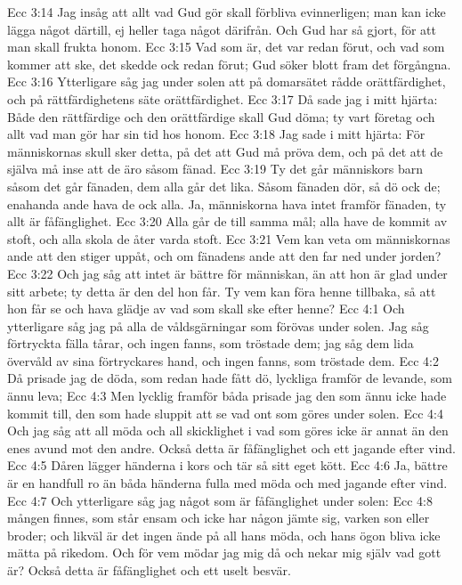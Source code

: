 Ecc 3:14  Jag insåg att allt vad Gud gör skall förbliva evinnerligen; man kan icke lägga något därtill, ej heller taga något därifrån. Och Gud har så gjort, för att man skall frukta honom.
Ecc 3:15  Vad som är, det var redan förut, och vad som kommer att ske, det skedde ock redan förut; Gud söker blott fram det förgångna.
Ecc 3:16  Ytterligare såg jag under solen att på domarsätet rådde orättfärdighet, och på rättfärdighetens säte orättfärdighet.
Ecc 3:17  Då sade jag i mitt hjärta: Både den rättfärdige och den orättfärdige skall Gud döma; ty vart företag och allt vad man gör har sin tid hos honom.
Ecc 3:18  Jag sade i mitt hjärta: För människornas skull sker detta, på det att Gud må pröva dem, och på det att de själva må inse att de äro såsom fänad.
Ecc 3:19  Ty det går människors barn såsom det går fänaden, dem alla går det lika. Såsom fänaden dör, så dö ock de; enahanda ande hava de ock alla. Ja, människorna hava intet framför fänaden, ty allt är fåfänglighet.
Ecc 3:20  Alla går de till samma mål; alla have de kommit av stoft, och alla skola de åter varda stoft.
Ecc 3:21  Vem kan veta om människornas ande att den stiger uppåt, och om fänadens ande att den far ned under jorden?
Ecc 3:22  Och jag såg att intet är bättre för människan, än att hon är glad under sitt arbete; ty detta är den del hon får. Ty vem kan föra henne tillbaka, så att hon får se och hava glädje av vad som skall ske efter henne?
Ecc 4:1  Och ytterligare såg jag på alla de våldsgärningar som förövas under solen. Jag såg förtryckta fälla tårar, och ingen fanns, som tröstade dem; jag såg dem lida övervåld av sina förtryckares hand, och ingen fanns, som tröstade dem.
Ecc 4:2  Då prisade jag de döda, som redan hade fått dö, lyckliga framför de levande, som ännu leva;
Ecc 4:3  Men lycklig framför båda prisade jag den som ännu icke hade kommit till, den som hade sluppit att se vad ont som göres under solen.
Ecc 4:4  Och jag såg att all möda och all skicklighet i vad som göres icke är annat än den enes avund mot den andre. Också detta är fåfänglighet och ett jagande efter vind.
Ecc 4:5  Dåren lägger händerna i kors och tär så sitt eget kött.
Ecc 4:6  Ja, bättre är en handfull ro än båda händerna fulla med möda och med jagande efter vind.
Ecc 4:7  Och ytterligare såg jag något som är fåfänglighet under solen:
Ecc 4:8  mången finnes, som står ensam och icke har någon jämte sig, varken son eller broder; och likväl är det ingen ände på all hans möda, och hans ögon bliva icke mätta på rikedom. Och för vem mödar jag mig då och nekar mig själv vad gott är? Också detta är fåfänglighet och ett uselt besvär.
